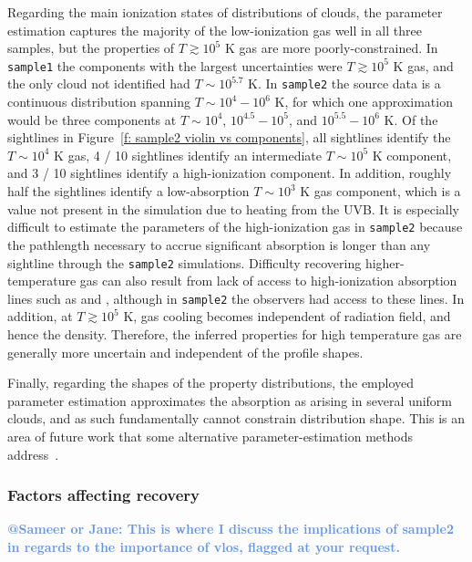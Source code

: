 \documentclass[fleqn,usenatbib]{mnras}
\makeatletter
\newcommand{\todo}[1]{\textcolor{Maroon}{\textbf{Address: #1}}}
\newcommand{\atsameer}[1]{\textcolor{CornflowerBlue}{\textbf{@Sameer or Jane: #1}}}
\makeatother
\begin{document}
Regarding the main ionization states of distributions of clouds,
the parameter estimation captures the majority of the low-ionization gas well in all three samples, but the properties of $T \gtrsim 10^5$ K gas are more poorly-constrained.
In \texttt{sample1} the components with the largest uncertainties were $T \gtrsim 10^5$ K gas,
and the only cloud not identified had $T \sim 10^{5.7}$ K.
In \texttt{sample2} the source data is a continuous distribution spanning $T \sim 10^4 - 10^6$ K,
for which one approximation would be three components at $T\sim 10^4$, $10^{4.5}-10^5$, and $10^{5.5}-10^6$ K.
Of the sightlines in Figure~\ref{f: sample2 violin vs components}, 
all sightlines identify the $T \sim 10^4$ K gas,
4 / 10 sightlines identify an intermediate $T \sim 10^5$ K component,
and 3 / 10 sightlines identify a high-ionization component.
In addition, roughly half the sightlines identify a low-absorption $T \sim 10^3$ K gas component, which is a value not present in the simulation due to heating from the UVB.
It is especially difficult to estimate the parameters of the high-ionization gas in \texttt{sample2} because the pathlength necessary to accrue significant absorption is longer than any sightline through the \texttt{sample2} simulations.
Difficulty recovering higher-temperature gas can also result from lack of access to high-ionization absorption lines such as  and ,
although in \texttt{sample2} the observers had access to these lines.
In addition, at $T \gtrsim 10^5$ K, gas cooling becomes independent of radiation field, and hence the density. 
Therefore, the inferred properties for high temperature gas are generally more uncertain and independent of the profile shapes.

Finally, regarding the shapes of the property distributions,
the employed parameter estimation approximates the absorption as arising in several uniform clouds,
and as such fundamentally cannot constrain distribution shape.
This is an area of future work that some alternative parameter-estimation methods address~\citep[e.g.][]{stern2016Universal}.

\subsubsection{Factors affecting recovery}
\label{s: discussion -- cloud structure -- factors}

\atsameer{This is where I discuss the implications of sample2 in regards to the importance of vlos, flagged at your request.}
\end{document}
